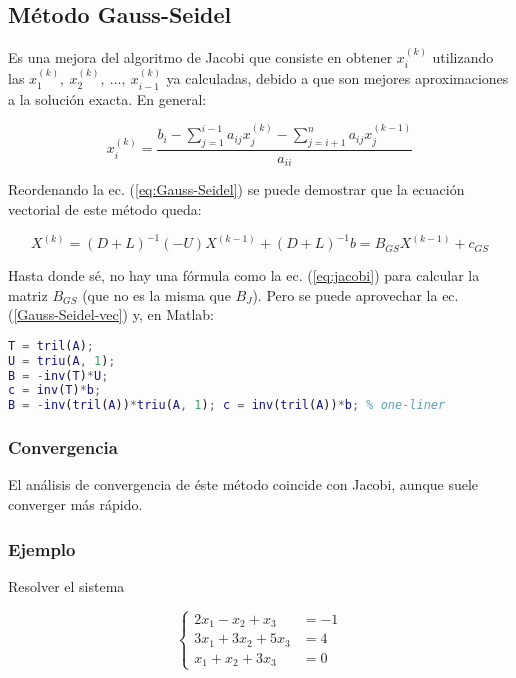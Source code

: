 \documentclass{article}
\begin{document}
\subsection{Método Gauss-Seidel}

Es una mejora del algoritmo de Jacobi que consiste en obtener $x_i^{(k)}$ 
utilizando las $x_1^{(k)},\ x_2^{(k)},\ \dots,\ x_{i-1}^{(k)}$ ya calculadas, 
debido a que son mejores aproximaciones a la solución exacta. En general:

\begin{equation}\label{eq:Gauss-Seidel}
    x_i^{(k)} = \frac{b_i - \sum_{j=1}^{i-1} a_{ij}x_j^{(k)} - \sum_{j=i+1}^n a_{ij}x_j^{(k-1)}}{a_{ii}}
\end{equation}

Reordenando la ec. (\ref{eq:Gauss-Seidel}) se puede demostrar que la ecuación 
vectorial de este método queda:

\begin{equation}\label{Gauss-Seidel-vec}
    X^{(k)} = (D+L)^{-1}(-U)X^{(k-1)} + (D+L)^{-1}b = B_{GS}X^{(k-1)} + c_{GS}
\end{equation}

Hasta donde sé, no hay una fórmula como la ec. (\ref{eq:jacobi}) para calcular 
la matriz $B_{GS}$ (que no es la misma que $B_J$). Pero se puede aprovechar la 
ec. (\ref{Gauss-Seidel-vec}) y, en Matlab:

\begin{lstlisting}[language=Matlab]
T = tril(A);
U = triu(A, 1);
B = -inv(T)*U;
c = inv(T)*b;
B = -inv(tril(A))*triu(A, 1); c = inv(tril(A))*b; % one-liner
\end{lstlisting}

\subsubsection{Convergencia}

El análisis de convergencia de éste método coincide con Jacobi, aunque suele 
converger más rápido.

\subsubsection{Ejemplo}

Resolver el sistema

\begin{equation*}
    \begin{cases}
        2x_1 - x_2 + x_3 &= -1  \\
        3x_1 + 3x_2 + 5x_3 &= 4 \\
        x_1 + x_2 + 3x_3 &= 0
    \end{cases}
\end{equation*}
\end{document}
